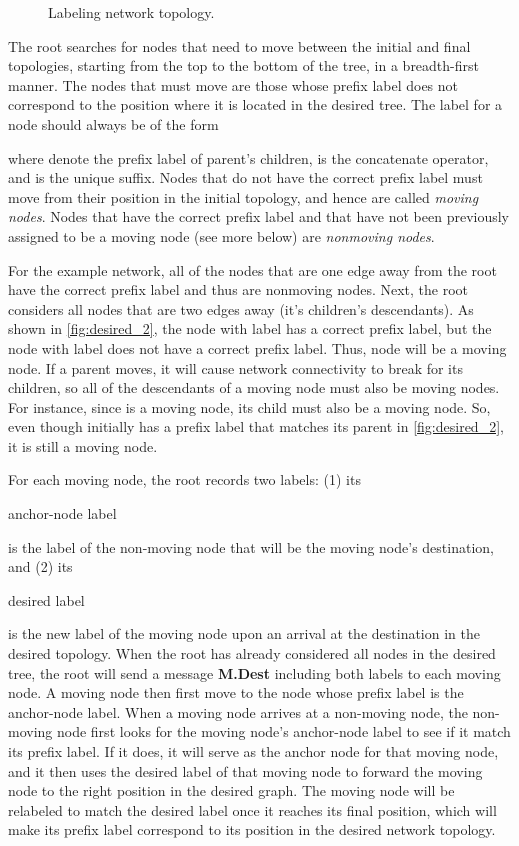 \documentclass[10pt,conference]{IEEEtran}
\begin{document}
\begin{figure}[t]
\centering
{}
\caption{Labeling network topology.} \label{fig:network_2}
\end{figure}

The root searches for nodes that need to move between the initial and
final topologies, starting from the top to the bottom of the tree, in
a breadth-first manner.  The nodes that must move are those whose
prefix label does not correspond to the position where it is located
in the desired tree.  The label for a node should always be of the
form

where  denote the prefix label of parent's children, 
is the concatenate operator, and  is the unique suffix.  Nodes that
do not have the correct prefix label must move from their position in
the initial topology, and hence are called {\it moving nodes}.  Nodes
that have the correct prefix label and that have not been previously
assigned to be a moving node (see more below) are {\it nonmoving nodes}.

For the example network, all of the nodes that are one edge away
from the root have the correct prefix label and thus are nonmoving
nodes. Next, the root considers all nodes that are two edges away
(it's children's descendants).  As shown in \autoref{fig:desired_2},
the node with label  has a correct prefix label, but the node
with label  does not have a correct prefix label.  Thus, node
 will be a moving node.  If a parent moves, it will cause
network connectivity to break for its children, so all of the
descendants of a moving node must also be moving nodes.  For instance,
since  is a moving node, its child  must also be a moving node.
So, even though  initially has a prefix label that matches its
parent in \autoref{fig:desired_2}, it is still a moving node.

For each moving node, the root records two labels: (1)
its \begin{it}anchor-node label \end{it} is the label of the
non-moving node that will be the moving node's destination, and (2)
its \begin{it} desired label\end{it} is the new label of the moving
node upon an arrival at the destination in the desired topology.  When
the root has already considered all nodes in the desired tree, the
root will send a message {\bf M.Dest} including both labels to each
moving node. A moving node then first move to the node whose prefix
label is the anchor-node label.  When a moving node arrives at a
non-moving node, the non-moving node first looks for the moving node's
anchor-node label to see if it match its prefix label. If it does, it
will serve as the anchor node for that moving node, and it then uses
the desired label of that moving node to forward the moving node to
the right position in the desired graph.  The moving node will be
relabeled to match the desired label once it reaches its final
position, which will make its prefix label correspond to
its position in the desired network topology.
\end{document}
